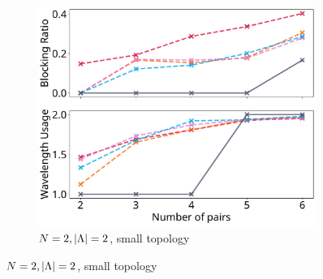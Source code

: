 \begin{figure}[H]
\begin{subfigure}{0.32\textwidth}
	\includegraphics[width=\textwidth]{pictures/plots/n_pairs/cc/x-2-2-s.pdf}
	\caption{\scriptsize$N=2, \lvert\Lambda\rvert = 2$, small topology}
\end{subfigure}
\label{fig:cc_pairs}
\end{figure}
